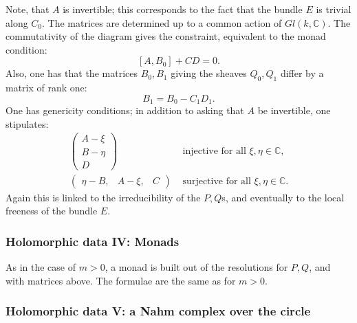 \documentclass[12pt]{article}
\theoremstyle{definition}
\theoremstyle{remark}
\numberwithin{theorem}{section}
\def\bC{{\mathbb {C}}}
\newcommand{\D}[2]{\frac{D #1}{d#2}}
\begin{document}
Note, that $A$ is invertible; this corresponds to the fact that the bundle $E$ is trivial along $C_0$. The matrices are determined up to a common action of $Gl(k,\bC)$. The commutativity of the diagram gives the constraint, equivalent to the monad condition:
 $$  [A,B_0] + CD=0. $$
 Also, one has that the matrices $B_0,B_1$ giving the sheaves $Q_0,Q_1$ differ by a matrix of rank one:
 $$B_1 =B_0 - C_1D_1.$$
One has genericity conditions; in addition to asking that $A$ be invertible, one stipulates:
  \begin{align}
\begin{pmatrix}A-\xi\\B-\eta\\D\end{pmatrix}
            &\text{ injective for all }\xi,\eta\in \bC,\label{gencon1.1}\\
\begin{pmatrix}\eta-B,&A-\xi,& C\end{pmatrix}
            &\text{ surjective for all }\xi,\eta\in \bC.\label{gencon2.1}
\end{align}
Again this is linked to the irreducibility of the $P,Q$s, and eventually to the local freeness of the bundle $E$.

 \subsubsection { Holomorphic data IV: Monads}
 
As in the case of $m>0$, a monad is built out of the resolutions for $P, Q$, and with matrices above. The formulae are the same as for $m>0$.
 
  \subsubsection { Holomorphic data V: a Nahm complex over the circle}
 
\end{document}
